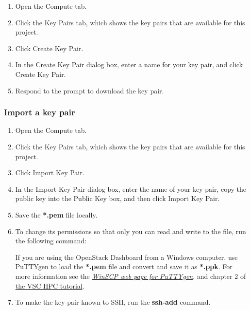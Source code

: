 \begin{enumerate}
\item Open the Compute tab.
\item Click the Key Pairs tab, which shows the key pairs that are
  available for this project.
\item Click Create Key Pair.
\item In the Create Key Pair dialog box, enter a name for your key
  pair, and click Create Key Pair.
\item Respond to the prompt to download the key pair.
  \end{enumerate}

\subsubsection{Import a key pair}\label{import-a-key-pair}

\begin{enumerate}
\item Open the Compute tab.
\item Click the Key Pairs tab, which shows the key pairs that are
  available for this project.
\item Click Import Key Pair.
\item In the Import Key Pair dialog box, enter the name of your key
  pair, copy the public key into the Public Key box, and then click
  Import Key Pair.
\item Save the \textbf{*.pem} file locally.
\item To change its permissions so that only you can read and write to
  the file, run the following command:

  \begin{prompt}
  \end{prompt}

   If you are using the \gls{OpenStack Dashboard} from a
  Windows computer, use PuTTYgen to load the \textbf{*.pem} file and
  convert and save it as \textbf{*.ppk}.  For more information see the
  \href{https://winscp.net/eng/docs/ui_puttygen}{\emph{WinSCP web page
      for PuTTYgen}}, and chapter 2 of
  \href{https://www.vscentrum.be/support/tut-book/vsc-tutorials}{the
    VSC HPC tutorial}.

\item To make the key pair known to SSH, run the \textbf{ssh-add}
  command.

  \begin{prompt}
  \end{prompt}
\end{enumerate}


